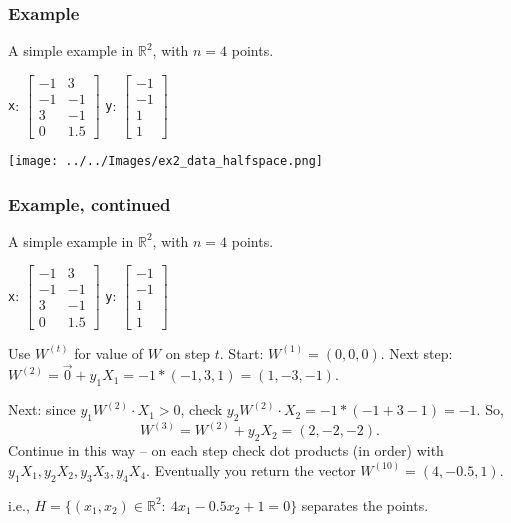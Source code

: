 \documentclass{beamer}
\theoremstyle{example}
\newcommand{\ttt}[1]{{\small\texttt{#1}}}
\begin{document}
\begin{frame}
    \frametitle{Example}
    A simple example in $\mathbb R^2$, with $n=4$ points.

    \begin{center}
    \ttt{x}: $\begin{bmatrix}-1 & 3 \\ -1 & -1 \\ 3 & -1 \\ 0 & 1.5\end{bmatrix}$  \qquad\qquad
    \ttt{y}: $\begin{bmatrix}-1 \\ -1 \\ 1 \\ 1\end{bmatrix}$
    \end{center}

    \centering
    \texttt{[image: ../../Images/ex2\_data\_halfspace.png]}
\end{frame}

\begin{frame}
    \frametitle{Example, continued}
    A simple example in $\mathbb R^2$, with $n=4$ points.

    \begin{center}
    \ttt{x}: $\begin{bmatrix}-1 & 3 \\ -1 & -1 \\ 3 & -1 \\ 0 & 1.5\end{bmatrix}$  \qquad\qquad
    \ttt{y}: $\begin{bmatrix}-1 \\ -1 \\ 1 \\ 1\end{bmatrix}$
    \end{center}

    Use $W^{(t)}$ for value of $W$ on step $t$. Start: $W^{(1)} = (0,0,0)$. \newline 
    Next step: $W^{(2)} = \vec{0} + y_1X_1 = -1\ast(-1,3,1) = (1,-3,-1)$.
    \pause
    
    Next: since $y_1W^{(2)}\cdot X_1 > 0$, check $y_2W^{(2)}\cdot X_2 = -1\ast(-1 + 3 -1) = -1$. \pause
    So, 
        \[W^{(3)} = W^{(2)} + y_2X_2 = (2, -2, -2).\]
    \pause 
    Continue in this way {--} on each step check dot products (in order) with $y_1X_1, y_2X_2, y_3X_3, y_4X_4$. Eventually you return the vector $W^{(10)} = (4, -0.5, 1)$. 
    
    \pause
    i.e., $H = \{(x_1,x_2)\in \mathbb R^2:\ 4x_1-0.5x_2 + 1 = 0\}$ separates the points.
\end{frame}
\end{document}
